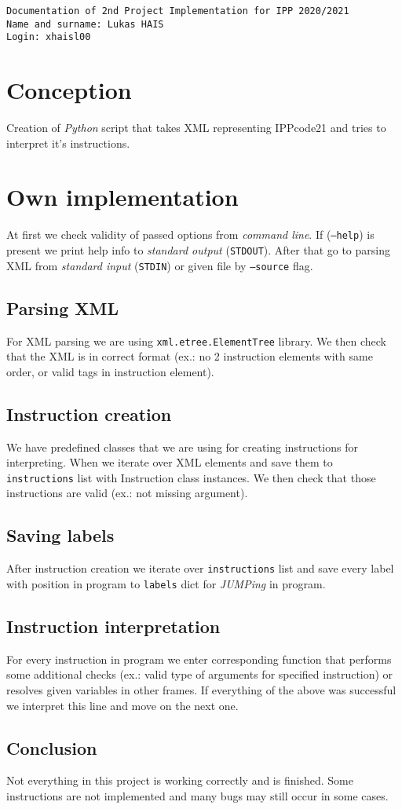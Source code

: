 \documentclass[12pt]{article}
\begin{document}
\begin{center}
	\texttt{Documentation of 2nd Project Implementation for IPP 2020/2021}\\
	\texttt{Name and surname: Lukas HAIS}\\
	\texttt{Login: xhaisl00}\\
\end{center}

\section{Conception}
Creation of \emph{Python} script that takes XML representing IPPcode21 and tries to interpret it's instructions.
\section{Own implementation}
At first we check validity of passed options from \emph{command line}. If (\texttt{--help}) is present we print help info to \emph{standard output} (\texttt{STDOUT}). After that go to parsing XML from \emph{standard input} (\texttt{STDIN}) or given file by \texttt{--source} flag.
\subsection{Parsing XML}
For XML parsing we are using \texttt{xml.etree.ElementTree} library. We then check that the XML is in correct format (ex.: no 2 instruction elements with same order, or valid tags in instruction element).
\subsection{Instruction creation}
We have predefined classes that we are using for creating instructions for interpreting. When we iterate over XML elements and save them to \texttt{instructions} list with Instruction class instances. We then check that those instructions are valid (ex.: not missing argument).
\subsection{Saving labels}
After instruction creation we iterate over \texttt{instructions} list and save every label with position in program to \texttt{labels} dict for \emph{JUMPing} in program.
\subsection{Instruction interpretation}
For every instruction in program we enter corresponding function that performs some additional checks (ex.: valid type of arguments for specified instruction) or resolves given variables in other frames. If everything of the above was successful we interpret this line and move on the next one.
\subsection{Conclusion}
Not everything in this project is working correctly and is finished. Some instructions are not implemented and many bugs may still occur in some cases.
\end{document}
